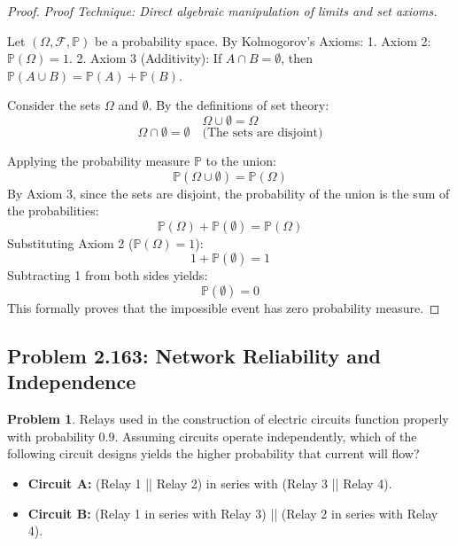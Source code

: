 \documentclass[11pt]{article}
\theoremstyle{definition}
\newtheorem{problem}{Problem}[section]
\theoremstyle{remark}
\newcommand{\F}{\mathcal{F}}
\newcommand{\Prob}{\mathbb{P}}
\begin{document}
\begin{proof}
\textit{Proof Technique: Direct algebraic manipulation of limits and set axioms.}

Let $(\Omega, \F, \Prob)$ be a probability space. By Kolmogorov's Axioms:
1. Axiom 2: $\Prob(\Omega) = 1$.
2. Axiom 3 (Additivity): If $A \cap B = \emptyset$, then $\Prob(A \cup B) = \Prob(A) + \Prob(B)$.

Consider the sets $\Omega$ and $\emptyset$. By the definitions of set theory:
\[ \Omega \cup \emptyset = \Omega \]
\[ \Omega \cap \emptyset = \emptyset \quad \text{(The sets are disjoint)} \]

Applying the probability measure $\Prob$ to the union:
\[ \Prob(\Omega \cup \emptyset) = \Prob(\Omega) \]
By Axiom 3, since the sets are disjoint, the probability of the union is the sum of the probabilities:
\[ \Prob(\Omega) + \Prob(\emptyset) = \Prob(\Omega) \]
Substituting Axiom 2 ($\Prob(\Omega) = 1$):
\[ 1 + \Prob(\emptyset) = 1 \]
Subtracting 1 from both sides yields:
\[ \Prob(\emptyset) = 0 \]
This formally proves that the impossible event has zero probability measure.
\end{proof}

\subsection{Problem 2.163: Network Reliability and Independence}
\begin{problem}
Relays used in the construction of electric circuits function properly with probability $0.9$. Assuming circuits operate independently, which of the following circuit designs yields the higher probability that current will flow?
\begin{itemize}
    \item \textbf{Circuit A:} (Relay 1 || Relay 2) in series with (Relay 3 || Relay 4).
    \item \textbf{Circuit B:} (Relay 1 in series with Relay 3) || (Relay 2 in series with Relay 4).
\end{itemize}
\end{problem}
\end{document}
